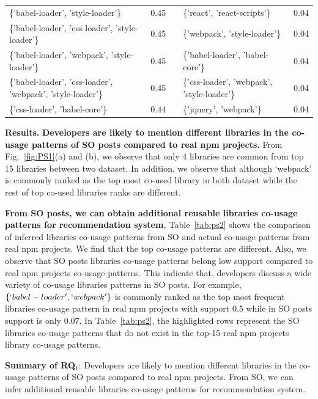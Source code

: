 \documentclass[paper]{ieice}
\begin{document}
\begin{table}[t]
\begin{tabular}{@{}lc|llc@{}}
\{'babel-loader', 'style-loader'\} & 0.45 &  & \cellcolor[HTML]{999999}\{'react', 'react-scripts'\} & 0.04 \\
\{'babel-loader', 'css-loader', 'style-loader'\} & 0.45 &  & \{'webpack', 'style-loader'\} & 0.04 \\
\{'babel-loader', 'webpack', 'style-loader'\} & 0.45 &  & \{'babel-loader', 'babel-core'\} & 0.04 \\
\{'babel-loader', 'css-loader', 'webpack', 'style-loader'\} & 0.45 &  & \{'css-loader', 'webpack', 'style-loader'\} & 0.04 \\
\{'css-loader', 'babel-core'\} & 0.44 &  & \cellcolor[HTML]{999999}\{'jquery', 'webpack'\} & 0.04 \\ \bottomrule
\end{tabular}%
\end{table}


\noindent\textbf{Results. }\textbf{Developers are likely to mention different libraries in the  co-usage patterns of SO posts compared to real npm projects.} From Fig.~\ref{fig:PS1}(a) and (b), we observe that only 4 libraries are common from top 15 libraries between two dataset. 
In addition, we observe that although `webpack' is commonly ranked as the top most co-used library in both dataset while the rest of top co-used libraries ranks are different.

\textbf{From SO posts, we can obtain additional reusable libraries co-usage patterns for recommendation system.} Table~\ref{tab:ps2} shows the comparison of inferred libraries co-usage patterns from SO and actual co-usage patterns from real npm projects.  We find that the top co-usage patterns are different. Also, we observe that SO posts libraries co-usage patterns belong low support compared to real npm projects co-usage patterns. This indicate that, developers discuss a wide variety of co-usage libraries patterns in SO posts. For example, $\{`babel-loader', `webpack' \}$ is commonly ranked as the top most frequent libraries co-usage pattern in real npm projects with support 0.5 while in SO posts support is only 0.07.  In Table~\ref{tab:ps2}, the highlighted rows represent the SO libraries co-usage patterns that do not exist in the top-15 real npm projects library co-usage patterns.

\begin{tcolorbox}
    \textbf{Summary of RQ$_1$}: 
    Developers are likely to mention different libraries in the co-usage patterns of SO posts compared to real npm projects. From SO, we can infer additional reusable libraries co-usage patterns for recommendation system.
\end{tcolorbox}
\end{document}
